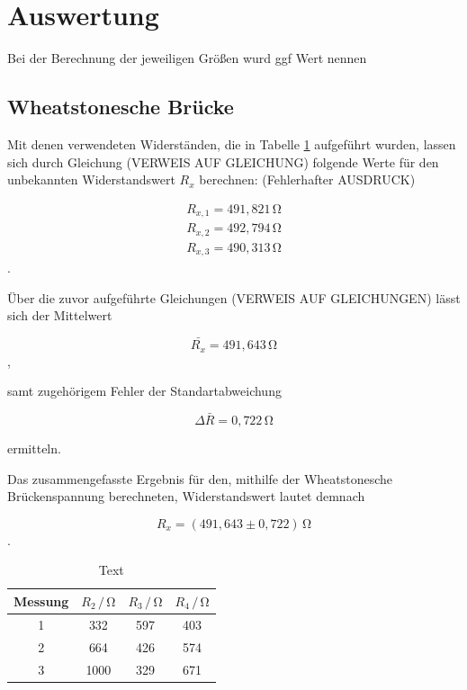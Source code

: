 \section{Auswertung}
\label{sec:Auswertung}

Bei der Berechnung der jeweiligen Größen wurd
ggf Wert nennen


\subsection{Wheatstonesche Brücke}

Mit denen verwendeten Widerständen, die in Tabelle \ref{tab:1} aufgeführt wurden, 
lassen sich durch Gleichung (VERWEIS AUF GLEICHUNG) folgende Werte für den 
unbekannten Widerstandswert $R_{x}$ berechnen:
(Fehlerhafter AUSDRUCK)

\begin{align}
R_{x,1} = 491,821\,\si{\ohm} \nonumber \\
R_{x,2} = 492,794\,\si{\ohm} \nonumber \\
R_{x,3} = 490,313\,\si{\ohm} \nonumber 
\end{align}.



\noindent
Über die zuvor aufgeführte Gleichungen (VERWEIS AUF GLEICHUNGEN) lässt sich der  
Mittelwert 

\begin{equation}
\bar{R_{x}} = 491,643\,\si{\ohm} \nonumber
\end{equation}, 

\noindent
samt zugehörigem Fehler der Standartabweichung

\begin{equation}
\Delta\bar{R} = 0,722\, \si{\ohm} \nonumber
\end{equation}

\noindent 
ermitteln.

\noindent
Das zusammengefasste Ergebnis für den, mithilfe der Wheatstonesche Brückenspannung berechneten, Widerstandswert
lautet demnach

\begin{equation}
R_{x} = (491,643 \pm 0,722)\,  \si{\ohm} \nonumber
\end{equation}.
    
\begin{table}
\normalsize

\centering
{}
\begin{tabular}{c c c c}
\toprule
        Messung & $R_{2} \,/\,\si{\ohm}$ & $R_{3} \,/\,\si{\ohm}$ & $R_{4} \,/\,\si{\ohm}$ \\
        \midrule
        1 & 332 & 597 & 403  \\
        2 & 664 & 426 & 574  \\
        3 & 1000 & 329 & 671 \\ 

\bottomrule

\end{tabular}

\caption{Text}
\label{tab:1}
\end{table}



